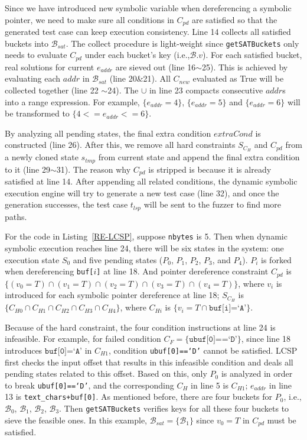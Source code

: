 Since we have introduced new symbolic variable when dereferencing a symbolic pointer,
we need to make sure all conditions in $C_{pd}$ are satisfied so that the generated
test case can keep execution consistency.
Line 14 collects all satisfied buckets into $\mathcal{B}_{sat}$. The collect procedure
is light-weight since \texttt{getSATBuckets} only needs to evaluate $C_{pd}$
under each bucket's key (i.e.,$\mathcal{B}.v$).
For each satisfied bucket, real solutions for current $e_{addr}$ are sieved out 
(line 16$\sim$25). This is achieved by evaluating each $addr$ in $\mathcal{B}_{sat}$
(line 20\&21). All $C_{new}$ evaluated as True will be collected together (line 22
$\sim$24). The $\cup$ in line 23 compacts consecutive $addr$s into a range expression.
For example, $\{e_{addr}=4\}$, $\{e_{addr}=5\}$ and $\{e_{addr}=6\}$ will be transformed to
$\{4<=e_{addr}<=6\}$.

By analyzing all pending states, the final extra condition $extraCond$ is constructed
(line 26).
After this, we remove all hard constraints $S_{C_H}$ and $C_{pd}$ from a newly cloned state $s_{tmp}$
from current state and append
the final extra condition to it (line 29$\sim$31). 
The reason why $C_{pd}$ is stripped is because it is already satisfied at line 14.
After appending all related conditions, the dynamic symbolic execution 
engine will try to generate a new test case (line 32), and once the 
generation successes, the test case $t_{lsp}$ will be sent to the 
fuzzer to find more paths.

For the code in Listing~\ref{RE-LCSP}, suppose \texttt{nbytes} is 5. 
Then when dynamic symbolic execution reaches line 24, there will be 
six states in the system: one execution state $S_0$ and five pending 
states ($P_0$, $P_1$, $P_2$, $P_3$, and $P_4$). $P_i$ is forked when 
dereferencing \texttt{buf[$i$]} at line 18. And pointer dereference
constraint $C_{pd}$ is $\{(v_0=T)\cap (v_1=T)\cap (v_2=T)\cap (v_3=T)\cap (v_4=T)\}$,
where $v_i$ is introduced for each symbolic pointer dereference at
line 18; $S_{C_H}$ is $\{C_{H0}\cap C_{H1}\cap C_{H2}\cap C_{H3}\cap C_{H4}\}$,
where $C_{Hi}$ is $\{v_i=T\cap \texttt{buf[i]=`A'}\}$.

Because of the hard constraint, the four condition instructions at line 24
is infeasible. 
For example, for failed condition $C_F=\{\texttt{ubuf[0]==`D'}\}$, since line
18 introduces $\texttt{buf[0]=`A'}$ in $C_{H1}$, condition \texttt{ubuf[0]==`D'} cannot
be satisfied. LCSP first checks the input offset that results in this infeasible
condition and deals all pending states related to this offset. Based on this,
only $P_0$ is analyzed in order to break \texttt{ubuf[0]==`D'}, and the
corresponding $C_H$ in line 5 is $C_{H1}$; $e_{addr}$ in line 13 is
\texttt{\texttt{text\_chars+buf[0]}}. As mentioned before,
there are four buckets for $P_0$, i.e., $\mathcal{B}_0$, $\mathcal{B}_1$, $\mathcal{B}_2$,
$\mathcal{B}_3$. Then \texttt{getSATBuckets} verifies keys for all these four buckets 
to sieve the feasible ones. In this example, $\mathcal{B}_{sat}=\{\mathcal{B}_1\}$ since
$v_0=T$ in $C_{pd}$ must be satisfied. 

